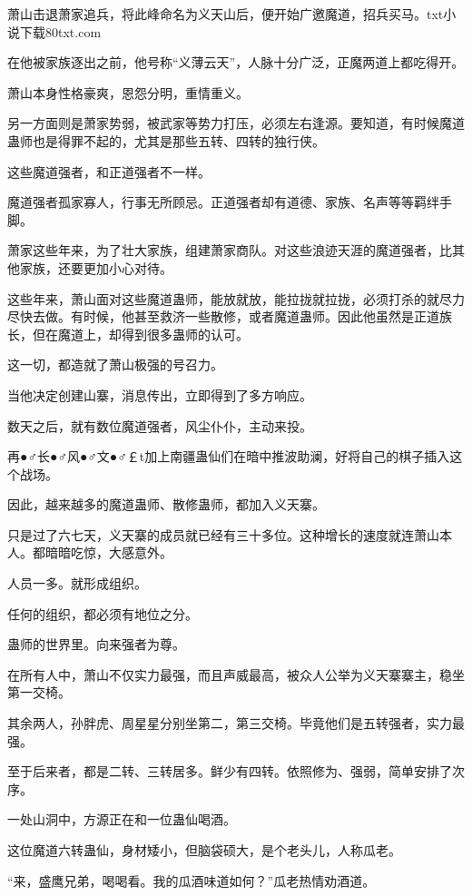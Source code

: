 
\begin{this_body}

萧山击退萧家追兵，将此峰命名为义天山后，便开始广邀魔道，招兵买马。txt小说下载80txt.com

在他被家族逐出之前，他号称“义薄云天”，人脉十分广泛，正魔两道上都吃得开。

萧山本身性格豪爽，恩怨分明，重情重义。

另一方面则是萧家势弱，被武家等势力打压，必须左右逢源。要知道，有时候魔道蛊师也是得罪不起的，尤其是那些五转、四转的独行侠。

这些魔道强者，和正道强者不一样。

魔道强者孤家寡人，行事无所顾忌。正道强者却有道德、家族、名声等等羁绊手脚。

萧家这些年来，为了壮大家族，组建萧家商队。对这些浪迹天涯的魔道强者，比其他家族，还要更加小心对待。

这些年来，萧山面对这些魔道蛊师，能放就放，能拉拢就拉拢，必须打杀的就尽力尽快去做。有时候，他甚至救济一些散修，或者魔道蛊师。因此他虽然是正道族长，但在魔道上，却得到很多蛊师的认可。

这一切，都造就了萧山极强的号召力。

当他决定创建山寨，消息传出，立即得到了多方响应。

数天之后，就有数位魔道强者，风尘仆仆，主动来投。

再●♂长●♂风●♂文●♂￡t加上南疆蛊仙们在暗中推波助澜，好将自己的棋子插入这个战场。

因此，越来越多的魔道蛊师、散修蛊师，都加入义天寨。

只是过了六七天，义天寨的成员就已经有三十多位。这种增长的速度就连萧山本人。都暗暗吃惊，大感意外。

人员一多。就形成组织。

任何的组织，都必须有地位之分。

蛊师的世界里。向来强者为尊。

在所有人中，萧山不仅实力最强，而且声威最高，被众人公举为义天寨寨主，稳坐第一交椅。

其余两人，孙胖虎、周星星分别坐第二，第三交椅。毕竟他们是五转强者，实力最强。

至于后来者，都是二转、三转居多。鲜少有四转。依照修为、强弱，简单安排了次序。

一处山洞中，方源正在和一位蛊仙喝酒。

这位魔道六转蛊仙，身材矮小，但脑袋硕大，是个老头儿，人称瓜老。

“来，盛鹰兄弟，喝喝看。我的瓜酒味道如何？”瓜老热情劝酒道。


\end{this_body}
